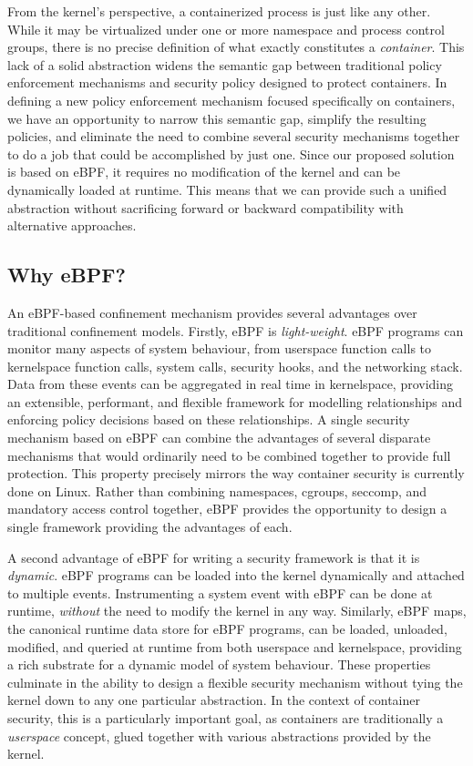 From the kernel's perspective, a containerized process is just like any other. While it
may be virtualized under one or more namespace and process control groups, there is no
precise definition of what exactly constitutes a \textit{container}. This lack of a solid
abstraction widens the semantic gap between traditional policy enforcement mechanisms and
security policy designed to protect containers. In defining a new policy enforcement mechanism
focused specifically on containers, we have an opportunity to narrow this semantic gap,
simplify the resulting policies, and eliminate the need to combine several security mechanisms
together to do a job that could be accomplished by just one. Since our proposed solution is based
on eBPF, it requires no modification of the kernel and can be dynamically loaded at runtime.
This means that we can provide such a unified abstraction without sacrificing forward
or backward compatibility with alternative approaches.

\subsection{Why eBPF?}%
\label{ss:why-ebpf}

An eBPF-based confinement mechanism provides several advantages over traditional
confinement models.  Firstly, eBPF is \textit{light-weight}. eBPF programs can monitor
many aspects of system behaviour, from userspace function calls to kernelspace function
calls, system calls, security hooks, and the networking stack. Data from these events can
be aggregated in real time in kernelspace, providing an extensible, performant, and
flexible framework for modelling relationships and enforcing policy decisions based on
these relationships.  A single security mechanism based on eBPF can combine the advantages
of several disparate mechanisms that would ordinarily need to be combined together to
provide full protection. This property precisely mirrors the way container security is
currently done on Linux. Rather than combining namespaces, cgroups, seccomp, and mandatory
access control together, eBPF provides the opportunity to design a single framework
providing the advantages of each.

A second advantage of eBPF for writing a security framework is that it is
\textit{dynamic}. eBPF programs can be loaded into the kernel dynamically and attached to
multiple events. Instrumenting a system event with eBPF can be done at runtime,
\textit{without} the need to modify the kernel in any way.  Similarly, eBPF maps, the
canonical runtime data store for eBPF programs, can be loaded, unloaded, modified, and
queried at runtime from both userspace and kernelspace, providing a rich substrate for
a dynamic model of system behaviour. These properties culminate in the ability to design
a flexible security mechanism without tying the kernel down to any one particular
abstraction. In the context of container security, this is a particularly important goal,
as containers are traditionally a \textit{userspace} concept, glued together with various
abstractions provided by the kernel.

